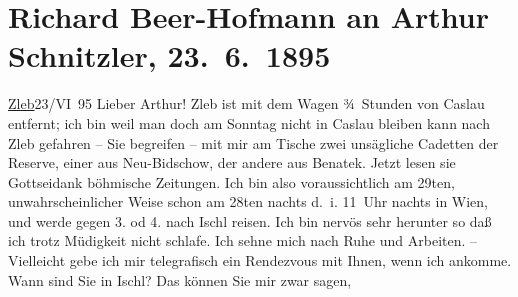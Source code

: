 

         
         \renewcommand{\erwaehntePersonen}{Personen: Hermann Bahr, Max Eugen Burckhard, Karl Lueger}
         \renewcommand{\erwaehnteOrte}{Orte: Bad Ischl, Benatek, Böhmen, Caslau, Nový Bydžov, Schleb, Wien}
         \renewcommand{\erwaehnteWerke}{Werke: Später Ruhm}
               \section[Richard Beer-Hofmann an Arthur Schnitzler, 23. 6. 1895]{ Richard Beer-Hofmann an Arthur Schnitzler, 23. 6. 1895}\nopagebreak{}\rehead{ }\begin{ledgroupsized}[t]{13cm}\normalsize\beginnumbering \toendnotes[C]{\smallbreak\pagebreak[2]} 
\pstart
           {\pb}\uline{Zleb}23/VI 95\pend
           \pstart
           Lieber Arthur! Zleb ist mit dem Wagen ¾ Stunden von Caslau entfernt; ich bin weil man doch am
                  Sonntag nicht in Caslau bleiben
               kann nach Zleb gefahren – Sie begreifen – mit mir
               am Tische zwei unsägliche Cadetten der Reserve, einer aus Neu-Bidschow, der andere {\pb}aus Benatek. Jetzt lesen sie Gottseidank böhmische Zeitungen.\pend
           \pstart
           Ich bin also voraussichtlich am 29ten, unwahrscheinlicher Weise schon am
                  28ten{ }nachts d. i. 11 Uhr nachts in Wien, und werde gegen 3. od 4. nach Ischl reisen. Ich bin nervös sehr herunter {\pb}so daß ich trotz Müdigkeit nicht
               schlafe. Ich sehne mich nach Ruhe und Arbeiten. –\pend
           \pstart
           Vielleicht gebe ich mir telegrafisch ein Rendezvous mit Ihnen, wenn ich ankomme. Wann
               sind Sie in Ischl? Das können Sie mir zwar sagen,

\end{ledgroupsized}
